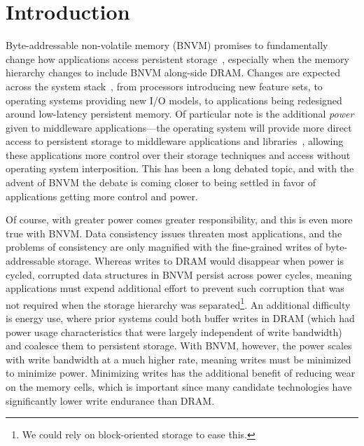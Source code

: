 \section{Introduction}

Byte-addressable non-volatile memory (BNVM) promises to fundamentally change
how applications access persistent
storage~\cite{lee_architecting_2009,fox:2001feram,sttram,wong2010phase,intel3dxpoint},
especially when the memory hierarchy changes to include BNVM along-side DRAM.
Changes are expected across the system stack~\cite{condit:sosp09}, from
processors introducing new feature sets, to operating systems providing new I/O
models, to applications being redesigned around low-latency persistent memory. Of
particular note is the additional \textit{power} given to middleware
applications---the operating system will provide more direct access to
persistent storage to middleware applications and
libraries~\cite{bittman-ssrctr-17-01}, allowing these applications more control
over their storage techniques and access without operating system interposition.
This has been a long debated topic, and with the advent of BNVM the debate is
coming closer to being settled in favor of applications getting more control and
power.

Of course, with greater power comes greater responsibility, and this is even
more true with BNVM. Data consistency issues threaten most applications, and the
problems of consistency are only magnified with the fine-grained writes of
byte-addressable storage. Whereas writes to DRAM would disappear when power is
cycled, corrupted data structures in BNVM persist across power cycles, meaning
applications must expend additional effort to prevent such corruption that was
not required when the storage hierarchy was separated\footnote{We could
rely on block-oriented storage to ease this.}. An additional
difficulty is energy use, where prior systems could both buffer writes in DRAM
(which had power usage characteristics that were largely independent of write
bandwidth) and coalesce them to persistent storage. With BNVM, however, the
power scales with write bandwidth at a much higher rate, meaning writes must be
minimized to minimize power. Minimizing writes has the additional benefit of
reducing wear on the memory cells, which is important since many candidate
technologies have significantly lower write endurance than DRAM.

